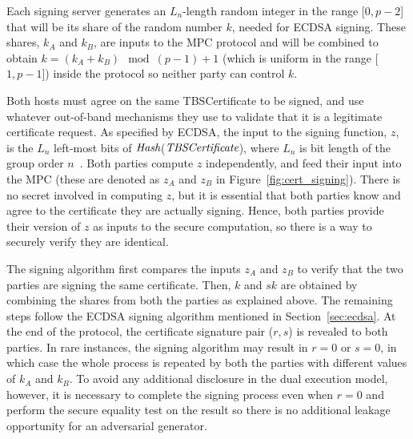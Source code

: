 Each signing server generates an $L_n$-length random integer in the range [$0, p-2$] that will be its share of the random number $k$, needed for ECDSA signing.  These shares, $k_A$ and $k_B$, are inputs to the MPC protocol and will be combined to obtain  $k = (k_A + k_B) \mod (p - 1) + 1$ (which is uniform in the range [$1, p-1$]) inside the protocol so neither party can control $k$. 

Both hosts must agree on the same TBSCertificate to be signed, and use whatever out-of-band mechanisms they use to validate that it is a legitimate certificate request.
As specified by ECDSA, the input to the signing function, $z$, is the $L_n$ left-most bits of $\textrm{\em Hash}$($\textrm{\em TBSCertificate}$), where $L_n$ is bit length of the group order $n$~\cite{elliptic_curve_digital_signature_algorithm}.  Both parties compute $z$ independently, and feed their input into the MPC (these are denoted as $z_A$ and $z_B$ in Figure~\ref{fig:cert_signing}). There is no secret involved in computing $z$, but it is essential that both parties know and agree to the certificate they are actually signing. Hence, both parties provide their version of $z$ as inputs to the secure computation, so there is a way to securely verify they are identical.

The signing algorithm first compares the inputs $z_A$ and $z_B$ to verify that the two parties are signing the same certificate. Then,  $k$ and $sk$ are obtained by combining the shares from both the parties as explained above. The remaining steps follow the ECDSA signing algorithm mentioned in Section~\ref{sec:ecdsa}. At the end of the protocol, the certificate signature pair ($r, s$) is revealed to both parties. In rare instances, the signing algorithm may result in $r = 0$ or $s = 0$, in which case the whole process is repeated by both the parties with different values of $k_A$ and $k_B$.  To avoid any additional disclosure in the dual execution model, however, it is necessary to complete the signing process even when $r = 0$ and perform the secure equality test on the result so there is no additional leakage opportunity for an adversarial generator.


